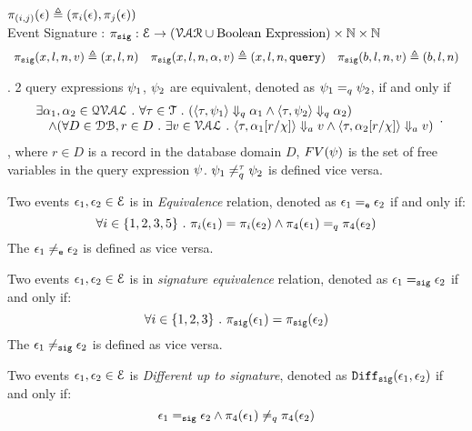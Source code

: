 $\pi_{(i,j)} (\mathtt{\epsilon}) \triangleq (\pi_i(\mathtt{\epsilon}), \pi_j(\mathtt{\epsilon})) $
%
\\
Event Signature : $\pi_{\mathtt{sig}} : \mathcal{E} \to (\mathcal{VAR}\cup \mbox{Boolean Expression}) \times\mathbb{N}\times \mathbb{N}$
\[
\begin{array}{lll}
\pi_{\mathtt{sig}} (x, l, n, v) \triangleq (x, l, n)
&
\pi_{\mathtt{sig}} (x, l, n, \alpha, v) \triangleq (x, l, n, {\tt query})
&
\pi_{\mathtt{sig}} (b, l, n, v)  \triangleq (b, l, n)
\end{array}
\]
%
%
\begin{defn}.
%
\label{def:query_equal}
2 query expressions $\psi_1$, $\psi_2$ are equivalent, denoted as $\psi_1 =_{q} \psi_2$, if and only if
$$
 \begin{array}{l} 
  \exists \alpha_1, \alpha_2 \in \mathcal{QVAL} ~.~ \forall \mathtt{\tau} \in \mathcal{T} ~.~
    (\langle \mathtt{\tau},  \psi_1 \rangle \Downarrow_q \alpha_1 \land \langle \mathtt{\tau},  \psi_2  \rangle \Downarrow_q \alpha_2) 
    \\
    \quad \land (\forall D \in \mathcal{DB}, r \in D ~.~ 
    \exists v \in \mathcal{VAL} ~.~ 
          \langle \mathtt{\tau}, \alpha_1[r/\chi] \rangle \Downarrow_a v \land \langle \mathtt{\tau},  \alpha_2[r/\chi]  \rangle \Downarrow_a v)  
  \end{array}.
$$
%
, where $r \in D$ is a record in the database domain $D$, $FV(\psi)$ is the set of free variables in the query expression $\psi$.
$\psi_1 \neq_{q}^{\mathtt{\tau}} \psi_2$  is defined vice versa.
%
\end{defn}
%
\begin{defn}
Two events $\mathtt{\epsilon}_1, \mathtt{\epsilon}_2 \in \mathcal{E}$ is in \emph{Equivalence} relation, denoted as $\mathtt{\epsilon}_1 =_{\mathtt{e}} \mathtt{\epsilon}_2$ if and only if:
\[
\forall i \in \{1, 2, 3, 5\} ~.~ \pi_{i}(\mathtt{\epsilon}_1) = \pi_{i}(\mathtt{\epsilon}_2) 
\land
\pi_{4}(\mathtt{\epsilon}_1) =_q \pi_{4}(\mathtt{\epsilon}_2)
\]
%
The $\mathtt{\epsilon}_1 \neq_{\mathtt{e}} \mathtt{\epsilon}_2$ is defined as vice versa.
\end{defn}
%
%
\begin{defn}
Two events $\mathtt{\epsilon}_1, \mathtt{\epsilon}_2 \in \mathcal{E}$ is in \emph{signature equivalence} relation, denoted as $\mathtt{\epsilon}_1 =_{\mathtt{sig}} \mathtt{\epsilon}_2$ if and only if:
\[
\forall i \in \{1, 2, 3\} ~.~ \pi_{\mathtt{sig}}(\mathtt{\epsilon}_1) = \pi_{\mathtt{sig}}(\mathtt{\epsilon}_2) 
\]
The $\mathtt{\epsilon}_1 \neq_{\mathtt{sig}} \mathtt{\epsilon}_2$ is defined as vice versa.
\end{defn}
%
\begin{defn}
Two events $\mathtt{\epsilon}_1, \mathtt{\epsilon}_2 \in \mathcal{E}$ is \emph{Different up to signature}, 
denoted as $\mathtt{Diff}_{\mathtt{sig}}(\mathtt{\epsilon}_1, \mathtt{\epsilon}_2)$ if and only if:
\[
\mathtt{\epsilon}_1 =_{\mathtt{sig}} \mathtt{\epsilon}_2 \land  \pi_{4}(\mathtt{\epsilon}_1) \neq_q \pi_{4}(\mathtt{\epsilon}_2)
\]
\end{defn}
